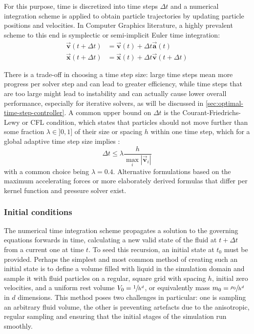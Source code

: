\documentclass[oneside, a4paper]{book}
\newcommand\abs[1]{\left|#1\right|}
\newcommand\vek[1]{\vec{\bm{#1}}}
\begin{document}
    For this purpose, time is discretized into time steps $\Delta t$ and a numerical integration scheme is applied to obtain particle trajectories by updating particle positions and velocities. In Computer Graphics literature, a highly prevalent scheme \autocites{tutorial2019}{wcsph}{iisph}{iisph-flip}{dfsph} to this end is symplectic or semi-implicit Euler time integration:
    \begin{align}\label{eq:numerical-time-integration}
      \vek{v}(t+\Delta t) &= \vek{v}(t) + \Delta t \vek{a}(t)\\
      \vek{x}(t+\Delta t) &= \vek{x}(t) + \Delta t \vek{v}(t+\Delta t)
    \end{align}

    There is a trade-off in choosing a time step size: large time steps mean more progress per solver step and can lead to greater efficiency, while time steps that are too large might lead to instability and can actually cause lower overall performance, especially for iterative solvers, as will be discussed in \autoref{sec:optimal-time-step-controller}. A common upper bound on $\Delta t$ is the Courant-Friedrichs-Lewy or CFL condition, which states that particles should not move further than some fraction $\lambda\in]0,1]$ of their size or spacing $h$ within one time step, which for a global adaptive time step size implies \autocite{tutorial2019}:
    \begin{equation}\label{eq:cfl-condition}
      \Delta t \leq \lambda \frac{h}{\max_i \abs{\vek{v}_i}}
    \end{equation}
    with a common choice \autocites{dfsph}{monaghan92} being $\lambda=0.4$. Alternative formulations based on the maximum accelerating forces \autocites{monaghan92}{time-adaptive-sph} or more elaborately derived formulas that differ per kernel function and pressure solver \autocite{optimal-timestep} exist.


    \subsubsection{Initial conditions}\label{subsec:initial-conditions}
    The numerical time integration scheme propagates a solution to the governing equations forwards in time, calculating a new valid state of the fluid at $t+\Delta t$ from a current one at time $t$. To seed this recursion, an initial state at $t_0$ must be provided. Perhaps the simplest and most common method of creating such an initial state is to define a volume filled with liquid in the simulation domain and sample it with fluid particles on a regular, square grid with spacing $h$, initial zero velocities, and a uniform rest volume $V_0=\sfrac{1}{h^d}$, or equivalently mass $m_0 = \sfrac{\rho_0 }{h^d}$ in $d$ dimensions. This method poses two challenges in particular: one is sampling an arbitrary fluid volume, the other is preventing artefacts due to the anisotropic, regular sampling and ensuring that the initial stages of the simulation run smoothly. 
\end{document}
